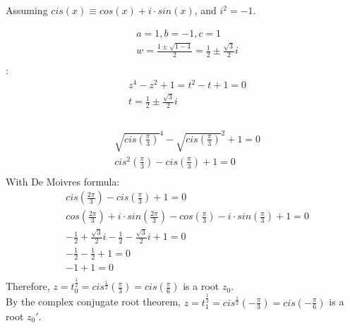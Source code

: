 \documentclass{myassignment}
\begin{document}
	Assuming $cis(x) \equiv cos(x) + i\cdot sin(x)$, and $i^2=-1$.
	\begin{answer}
		\begin{eqnarray}
			&a = 1, b = -1, c = 1 \\
			&w = \frac{1\pm\sqrt{1-4}}{2} = \frac{1}{2}\pm\frac{\sqrt{3}}{2}i\\
		\end{eqnarray}
		:\\
		\begin{eqnarray}
			&z^4 - z^2 + 1 = t^2-t+1 = 0\\
			&t = {\frac{1}{2}\pm\frac{\sqrt{3}}{2}i}\\
		\end{eqnarray}
		\\
		\begin{eqnarray}
			&\sqrt{cis(\frac{\pi}{3})}^4 - \sqrt{cis(\frac{\pi}{3})}^2 + 1 = 0\\
			&cis^2(\frac{\pi}{3}) - cis(\frac{\pi}{3}) + 1 = 0\\
		\end{eqnarray}
		With De Moivres formula:
		\begin{eqnarray}
			&cis(\frac{2\pi}{3}) - cis(\frac{\pi}{3}) + 1 = 0\\
			&cos(\frac{2\pi}{3}) + i\cdot sin(\frac{2\pi}{3}) - cos(\frac{\pi}{3}) - i\cdot sin(\frac{\pi}{3}) + 1 = 0\\
			&-\frac{1}{2} + \frac{\sqrt{3}}{2}i - \frac{1}{2} - \frac{\sqrt{3}}{2} i + 1 = 0\\
			&-\frac{1}{2} - \frac{1}{2} + 1 = 0\\
			&-1 + 1 = 0\\
		\end{eqnarray}
		Therefore, $z = t_0^{\frac{1}{2}} = cis^{\frac{1}{2}}(\frac{\pi}{3}) = cis(\frac{\pi}{6})$ is a root $z_0$.\\
		By the complex conjugate root theorem, $z=t_1^{\frac{1}{2}}=cis^{\frac{1}{2}}(-\frac{\pi}{3})=cis(-\frac{\pi}{6})$ is a root $z_0'$.\blackqed
		

\end{answer}
\end{document}
